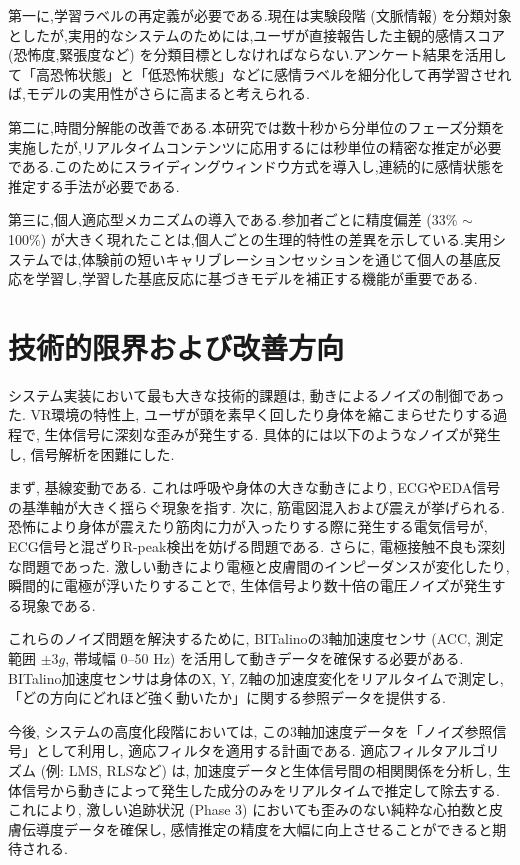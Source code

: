 \documentclass[book,paper=a4,fontsize=10pt,jafontscale=0.92]{jlreq}
\begin{document}
第一に,学習ラベルの再定義が必要である.現在は実験段階 (文脈情報) を分類対象としたが,実用的なシステムのためには,ユーザが直接報告した主観的感情スコア (恐怖度,緊張度など) を分類目標としなければならない.アンケート結果を活用して「高恐怖状態」と「低恐怖状態」などに感情ラベルを細分化して再学習させれば,モデルの実用性がさらに高まると考えられる.

第二に,時間分解能の改善である.本研究では数十秒から分単位のフェーズ分類を実施したが,リアルタイムコンテンツに応用するには秒単位の精密な推定が必要である.このためにスライディングウィンドウ方式を導入し,連続的に感情状態を推定する手法が必要である.

第三に,個人適応型メカニズムの導入である.参加者ごとに精度偏差 (33\% $\sim$ 100\%) が大きく現れたことは,個人ごとの生理的特性の差異を示している.実用システムでは,体験前の短いキャリブレーションセッションを通じて個人の基底反応を学習し,学習した基底反応に基づきモデルを補正する機能が重要である.

\section{技術的限界および改善方向}
システム実装において最も大きな技術的課題は, 動きによるノイズの制御であった. VR環境の特性上, ユーザが頭を素早く回したり身体を縮こまらせたりする過程で, 生体信号に深刻な歪みが発生する. 具体的には以下のようなノイズが発生し, 信号解析を困難にした.

まず, 基線変動である. これは呼吸や身体の大きな動きにより, ECGやEDA信号の基準軸が大きく揺らぐ現象を指す.
次に, 筋電図混入および震えが挙げられる. 恐怖により身体が震えたり筋肉に力が入ったりする際に発生する電気信号が, ECG信号と混ざりR-peak検出を妨げる問題である.
さらに, 電極接触不良も深刻な問題であった. 激しい動きにより電極と皮膚間のインピーダンスが変化したり, 瞬間的に電極が浮いたりすることで, 生体信号より数十倍の電圧ノイズが発生する現象である.

これらのノイズ問題を解決するために, BITalinoの3軸加速度センサ (ACC, 測定範囲 $\pm 3 g$, 帯域幅 0--50 Hz) を活用して動きデータを確保する必要がある. BITalino加速度センサは身体のX, Y, Z軸の加速度変化をリアルタイムで測定し, 「どの方向にどれほど強く動いたか」に関する参照データを提供する.

今後, システムの高度化段階においては, この3軸加速度データを「ノイズ参照信号」として利用し, 適応フィルタを適用する計画である. 適応フィルタアルゴリズム (例: LMS, RLSなど) は, 加速度データと生体信号間の相関関係を分析し, 生体信号から動きによって発生した成分のみをリアルタイムで推定して除去する. これにより, 激しい追跡状況 (Phase 3) においても歪みのない純粋な心拍数と皮膚伝導度データを確保し, 感情推定の精度を大幅に向上させることができると期待される.
\end{document}
